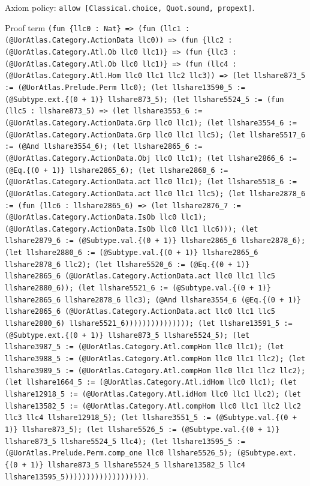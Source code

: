 \documentclass[11pt]{article}
\begin{document}
\noindent Axiom policy: \texttt{allow [Classical.choice, Quot.sound, propext]}.\par
\noindent Proof term \texttt{(fun \{llc0 : Nat\} => (fun (llc1 : (@UorAtlas.Category.ActionData llc0)) => (fun \{llc2 : (@UorAtlas.Category.Atl.Ob llc0 llc1)\} => (fun \{llc3 : (@UorAtlas.Category.Atl.Ob llc0 llc1)\} => (fun (llc4 : (@UorAtlas.Category.Atl.Hom llc0 llc1 llc2 llc3)) => (let llshare873\_5 := (@UorAtlas.Prelude.Perm llc0); (let llshare13590\_5 := (@Subtype.ext.\{(0 + 1)\} llshare873\_5); (let llshare5524\_5 := (fun (llc5 : llshare873\_5) => (let llshare3553\_6 := (@UorAtlas.Category.ActionData.Grp llc0 llc1); (let llshare3554\_6 := (@UorAtlas.Category.ActionData.Grp llc0 llc1 llc5); (let llshare5517\_6 := (@And llshare3554\_6); (let llshare2865\_6 := (@UorAtlas.Category.ActionData.Obj llc0 llc1); (let llshare2866\_6 := (@Eq.\{(0 + 1)\} llshare2865\_6); (let llshare2868\_6 := (@UorAtlas.Category.ActionData.act llc0 llc1); (let llshare5518\_6 := (@UorAtlas.Category.ActionData.act llc0 llc1 llc5); (let llshare2878\_6 := (fun (llc6 : llshare2865\_6) => (let llshare2876\_7 := (@UorAtlas.Category.ActionData.IsOb llc0 llc1); (@UorAtlas.Category.ActionData.IsOb llc0 llc1 llc6))); (let llshare2879\_6 := (@Subtype.val.\{(0 + 1)\} llshare2865\_6 llshare2878\_6); (let llshare2880\_6 := (@Subtype.val.\{(0 + 1)\} llshare2865\_6 llshare2878\_6 llc2); (let llshare5520\_6 := (@Eq.\{(0 + 1)\} llshare2865\_6 (@UorAtlas.Category.ActionData.act llc0 llc1 llc5 llshare2880\_6)); (let llshare5521\_6 := (@Subtype.val.\{(0 + 1)\} llshare2865\_6 llshare2878\_6 llc3); (@And llshare3554\_6 (@Eq.\{(0 + 1)\} llshare2865\_6 (@UorAtlas.Category.ActionData.act llc0 llc1 llc5 llshare2880\_6) llshare5521\_6))))))))))))))); (let llshare13591\_5 := (@Subtype.ext.\{(0 + 1)\} llshare873\_5 llshare5524\_5); (let llshare3987\_5 := (@UorAtlas.Category.Atl.compHom llc0 llc1); (let llshare3988\_5 := (@UorAtlas.Category.Atl.compHom llc0 llc1 llc2); (let llshare3989\_5 := (@UorAtlas.Category.Atl.compHom llc0 llc1 llc2 llc2); (let llshare1664\_5 := (@UorAtlas.Category.Atl.idHom llc0 llc1); (let llshare12918\_5 := (@UorAtlas.Category.Atl.idHom llc0 llc1 llc2); (let llshare13582\_5 := (@UorAtlas.Category.Atl.compHom llc0 llc1 llc2 llc2 llc3 llc4 llshare12918\_5); (let llshare3551\_5 := (@Subtype.val.\{(0 + 1)\} llshare873\_5); (let llshare5526\_5 := (@Subtype.val.\{(0 + 1)\} llshare873\_5 llshare5524\_5 llc4); (let llshare13595\_5 := (@UorAtlas.Prelude.Perm.comp\_one llc0 llshare5526\_5); (@Subtype.ext.\{(0 + 1)\} llshare873\_5 llshare5524\_5 llshare13582\_5 llc4 llshare13595\_5)))))))))))))))))))}.\par
\end{document}
